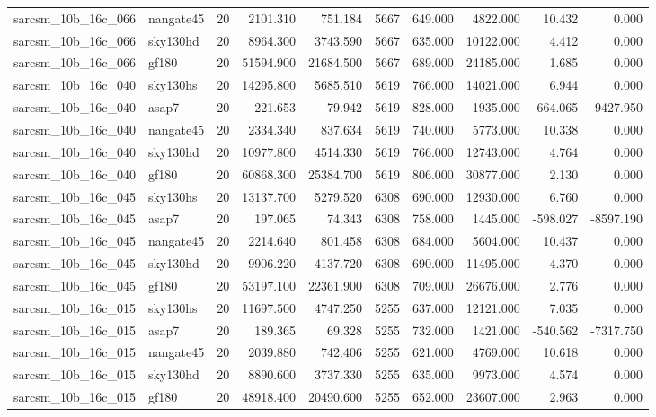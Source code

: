 \documentclass{article}
\begin{document}
\begin{longtable}{llrrrrrrrr}
sarcsm\_10b\_16c\_066 & nangate45 & 20 & 2101.310 & 751.184 & 5667 & 649.000 & 4822.000 & 10.432 & 0.000 \\
sarcsm\_10b\_16c\_066 & sky130hd & 20 & 8964.300 & 3743.590 & 5667 & 635.000 & 10122.000 & 4.412 & 0.000 \\
sarcsm\_10b\_16c\_066 & gf180 & 20 & 51594.900 & 21684.500 & 5667 & 689.000 & 24185.000 & 1.685 & 0.000 \\
sarcsm\_10b\_16c\_040 & sky130hs & 20 & 14295.800 & 5685.510 & 5619 & 766.000 & 14021.000 & 6.944 & 0.000 \\
sarcsm\_10b\_16c\_040 & asap7 & 20 & 221.653 & 79.942 & 5619 & 828.000 & 1935.000 & -664.065 & -9427.950 \\
sarcsm\_10b\_16c\_040 & nangate45 & 20 & 2334.340 & 837.634 & 5619 & 740.000 & 5773.000 & 10.338 & 0.000 \\
sarcsm\_10b\_16c\_040 & sky130hd & 20 & 10977.800 & 4514.330 & 5619 & 766.000 & 12743.000 & 4.764 & 0.000 \\
sarcsm\_10b\_16c\_040 & gf180 & 20 & 60868.300 & 25384.700 & 5619 & 806.000 & 30877.000 & 2.130 & 0.000 \\
sarcsm\_10b\_16c\_045 & sky130hs & 20 & 13137.700 & 5279.520 & 6308 & 690.000 & 12930.000 & 6.760 & 0.000 \\
sarcsm\_10b\_16c\_045 & asap7 & 20 & 197.065 & 74.343 & 6308 & 758.000 & 1445.000 & -598.027 & -8597.190 \\
sarcsm\_10b\_16c\_045 & nangate45 & 20 & 2214.640 & 801.458 & 6308 & 684.000 & 5604.000 & 10.437 & 0.000 \\
sarcsm\_10b\_16c\_045 & sky130hd & 20 & 9906.220 & 4137.720 & 6308 & 690.000 & 11495.000 & 4.370 & 0.000 \\
sarcsm\_10b\_16c\_045 & gf180 & 20 & 53197.100 & 22361.900 & 6308 & 709.000 & 26676.000 & 2.776 & 0.000 \\
sarcsm\_10b\_16c\_015 & sky130hs & 20 & 11697.500 & 4747.250 & 5255 & 637.000 & 12121.000 & 7.035 & 0.000 \\
sarcsm\_10b\_16c\_015 & asap7 & 20 & 189.365 & 69.328 & 5255 & 732.000 & 1421.000 & -540.562 & -7317.750 \\
sarcsm\_10b\_16c\_015 & nangate45 & 20 & 2039.880 & 742.406 & 5255 & 621.000 & 4769.000 & 10.618 & 0.000 \\
sarcsm\_10b\_16c\_015 & sky130hd & 20 & 8890.600 & 3737.330 & 5255 & 635.000 & 9973.000 & 4.574 & 0.000 \\
sarcsm\_10b\_16c\_015 & gf180 & 20 & 48918.400 & 20490.600 & 5255 & 652.000 & 23607.000 & 2.963 & 0.000 \\

\end{longtable}
\end{document}
